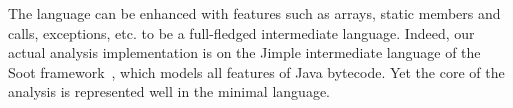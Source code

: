 The language can be enhanced with features such as arrays, static members and
calls, exceptions, etc. to be a full-fledged intermediate language.
Indeed, our actual analysis implementation is on the Jimple intermediate
language of the Soot framework~\cite{vall99soot},%
which
models all features of Java bytecode. Yet the core of the analysis is
represented well in the minimal language.

